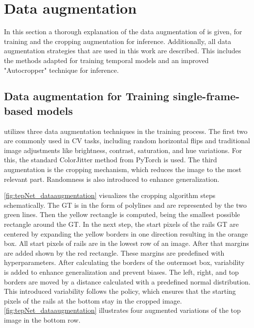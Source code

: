 \section{Data augmentation}
\label{sec:dataaugmentation}

In this section a thorough explanation of the data augmentation of \cite{tepNet2024} is given, for training and the cropping augmentation for inference.
Additionally, all data augmentation strategies that are used in this work are described.
This includes the methods adapted for training temporal models and an improved "Autocropper" technique for inference.

\subsection{Data augmentation for Training single-frame-based models}

\cite{tepNet2024} utilizes three data augmentation techniques in the training process.
The first two are commonly used in \ac{CV} tasks, including random horizontal flips and traditional image adjustments like brightness, contrast, saturation, and hue variations.
For this, the standard ColorJitter \cite{pytorch_colorJitter_docu} method from PyTorch is used.
The third augmentation is the cropping mechanism, which reduces the image to the most relevant part.
Randomness is also introduced to enhance generalization.

\autoref{fig:tepNet_dataaugmentation} visualizes the cropping algorithm steps schematically.
The \ac{GT} is in the form of polylines and are represented by the two green lines.
Then the yellow rectangle is computed, being the smallest possible rectangle around the \ac{GT}.
In the next step, the start pixels of the rails \ac{GT} are centered by expanding the yellow borders in one direction resulting in the orange box.
All start pixels of rails are in the lowest row of an image.
After that margins are added shown by the red rectangle.
These margins are predefined with hyperparameters.
After calculating the borders of the outermost box, variability is added to enhance generalization and prevent biases.
The left, right, and top borders are moved by a distance calculated with a predefined normal distribution.
This introduced variability follows the policy, which ensures that the starting pixels of the rails at the bottom stay in the cropped image.
\autoref{fig:tepNet_dataaugmentation} illustrates four augmented variations of the top image in the bottom row.

